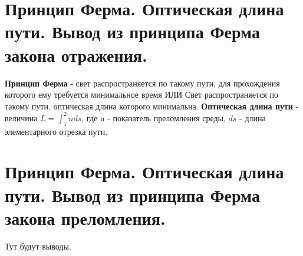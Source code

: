 \documentclass[14pt]{extarticle}
\begin{document}
\section{Принцип Ферма. Оптическая длина пути. Вывод из принципа Ферма закона
отражения.}
\textbf{Принцип Ферма} - свет распространяется по такому пути,
для прохождения которого ему требуется минимальное время ИЛИ 
Свет распространяется по такому пути, оптическая длина которого 
минимальна. 
\textbf{Оптическая длина пути} - величина 
$L = \int_{1}^{2} n ds$, где n - показатель преломления 
среды, $ds$ - длина элементарного отрезка пути.
\section{Принцип Ферма. Оптическая длина пути. Вывод из принципа Ферма закона
преломления.} 
Тут будут выводы.
\end{document}
